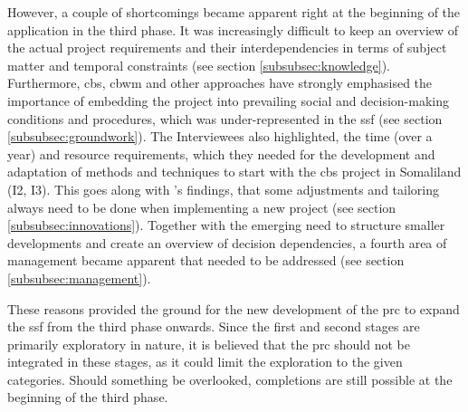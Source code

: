However, a couple of shortcomings became apparent right at the beginning of the application in the third phase. It was increasingly difficult to keep an overview of the actual project requirements and their interdependencies in terms of subject matter and temporal constraints (see section \ref{subsubsec:knowledge}). Furthermore, \acrshort{cbs}, \acrshort{cbwm} and other approaches have strongly emphasised the importance of embedding the project into prevailing social and decision-making conditions and procedures, which was under-represented in the \acrshort{ssf} (see section \ref{subsubsec:groundwork}). The Interviewees also highlighted, the time (over a year) and resource requirements, which they needed for the development and adaptation of methods and techniques to start with the \acrshort{cbs} project in Somaliland (I2, I3). This goes along with \autocite{garciaFindingWhatYou2021}'s findings, that some adjustments and tailoring always need to be done when implementing a new project (see section \ref{subsubsec:innovations}). Together with the emerging need to structure smaller developments and create an overview of decision dependencies, a fourth area of management became apparent that needed to be addressed (see section \ref{subsubsec:management}).



These reasons provided the ground for the new development of the \acrlong{prc} to expand the \acrshort{ssf} from the third phase onwards. Since the first and second stages are primarily exploratory in nature, it is believed that the \acrshort{prc} should not be integrated in these stages, as it could limit the exploration to the given categories. Should something be overlooked, completions are still possible at the beginning of the third phase.\newline

